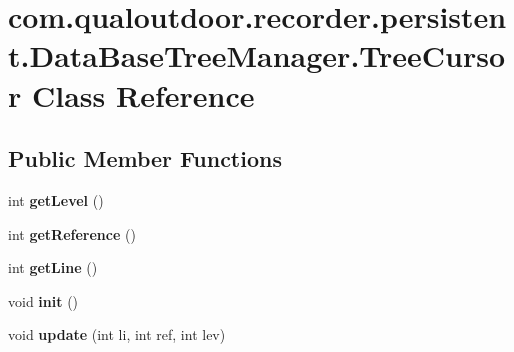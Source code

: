 \hypertarget{classcom_1_1qualoutdoor_1_1recorder_1_1persistent_1_1DataBaseTreeManager_1_1TreeCursor}{\section{com.\-qualoutdoor.\-recorder.\-persistent.\-Data\-Base\-Tree\-Manager.\-Tree\-Cursor Class Reference}
\label{classcom_1_1qualoutdoor_1_1recorder_1_1persistent_1_1DataBaseTreeManager_1_1TreeCursor}
}
\subsection*{Public Member Functions}
\begin{DoxyCompactItemize}
\item 
\hypertarget{classcom_1_1qualoutdoor_1_1recorder_1_1persistent_1_1DataBaseTreeManager_1_1TreeCursor_ae0dd02d3f4915adb028af02defc1c0da}{int {\bfseries get\-Level} ()}\label{classcom_1_1qualoutdoor_1_1recorder_1_1persistent_1_1DataBaseTreeManager_1_1TreeCursor_ae0dd02d3f4915adb028af02defc1c0da}

\item 
\hypertarget{classcom_1_1qualoutdoor_1_1recorder_1_1persistent_1_1DataBaseTreeManager_1_1TreeCursor_ae58b6839a912692839c3f75c80f1e66d}{int {\bfseries get\-Reference} ()}\label{classcom_1_1qualoutdoor_1_1recorder_1_1persistent_1_1DataBaseTreeManager_1_1TreeCursor_ae58b6839a912692839c3f75c80f1e66d}

\item 
\hypertarget{classcom_1_1qualoutdoor_1_1recorder_1_1persistent_1_1DataBaseTreeManager_1_1TreeCursor_ae0b2d2ca1e3d2661a34e4f05537e01a4}{int {\bfseries get\-Line} ()}\label{classcom_1_1qualoutdoor_1_1recorder_1_1persistent_1_1DataBaseTreeManager_1_1TreeCursor_ae0b2d2ca1e3d2661a34e4f05537e01a4}

\item 
\hypertarget{classcom_1_1qualoutdoor_1_1recorder_1_1persistent_1_1DataBaseTreeManager_1_1TreeCursor_a9a96dc75d62639612c3b9e460c3a9cf2}{void {\bfseries init} ()}\label{classcom_1_1qualoutdoor_1_1recorder_1_1persistent_1_1DataBaseTreeManager_1_1TreeCursor_a9a96dc75d62639612c3b9e460c3a9cf2}

\item 
\hypertarget{classcom_1_1qualoutdoor_1_1recorder_1_1persistent_1_1DataBaseTreeManager_1_1TreeCursor_ac0b4683f2f2df535c96b5bdf17b6bdc3}{void {\bfseries update} (int li, int ref, int lev)}\label{classcom_1_1qualoutdoor_1_1recorder_1_1persistent_1_1DataBaseTreeManager_1_1TreeCursor_ac0b4683f2f2df535c96b5bdf17b6bdc3}

\end{DoxyCompactItemize}
